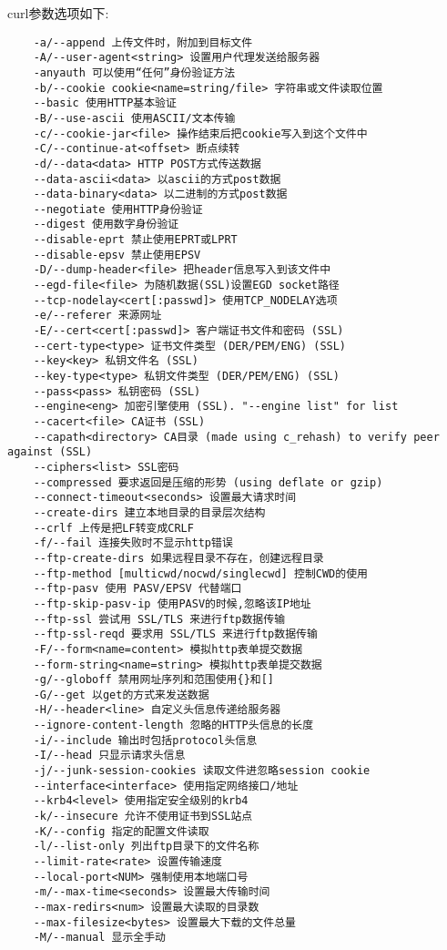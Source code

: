\documentclass[a4paper,left=2.5cm,right=2.5cm,11pt]{article}
\begin{document}
	curl参数选项如下:
	\begin{lstlisting}
	-a/--append 上传文件时，附加到目标文件 
	-A/--user-agent<string> 设置用户代理发送给服务器 
	-anyauth 可以使用“任何”身份验证方法 
	-b/--cookie cookie<name=string/file> 字符串或文件读取位置 
	--basic 使用HTTP基本验证 
	-B/--use-ascii 使用ASCII/文本传输 
	-c/--cookie-jar<file> 操作结束后把cookie写入到这个文件中 
	-C/--continue-at<offset> 断点续转 
	-d/--data<data> HTTP POST方式传送数据 
	--data-ascii<data> 以ascii的方式post数据 
	--data-binary<data> 以二进制的方式post数据 
	--negotiate 使用HTTP身份验证 
	--digest 使用数字身份验证 
	--disable-eprt 禁止使用EPRT或LPRT 
	--disable-epsv 禁止使用EPSV 
	-D/--dump-header<file> 把header信息写入到该文件中 
	--egd-file<file> 为随机数据(SSL)设置EGD socket路径 
	--tcp-nodelay<cert[:passwd]> 使用TCP_NODELAY选项 
	-e/--referer 来源网址 
	-E/--cert<cert[:passwd]> 客户端证书文件和密码 (SSL) 
	--cert-type<type> 证书文件类型 (DER/PEM/ENG) (SSL) 
	--key<key> 私钥文件名 (SSL) 
	--key-type<type> 私钥文件类型 (DER/PEM/ENG) (SSL) 
	--pass<pass> 私钥密码 (SSL) 
	--engine<eng> 加密引擎使用 (SSL). "--engine list" for list 
	--cacert<file> CA证书 (SSL) 
	--capath<directory> CA目录 (made using c_rehash) to verify peer against (SSL) 
	--ciphers<list> SSL密码 
	--compressed 要求返回是压缩的形势 (using deflate or gzip) 
	--connect-timeout<seconds> 设置最大请求时间 
	--create-dirs 建立本地目录的目录层次结构 
	--crlf 上传是把LF转变成CRLF 
	-f/--fail 连接失败时不显示http错误 
	--ftp-create-dirs 如果远程目录不存在，创建远程目录 
	--ftp-method [multicwd/nocwd/singlecwd] 控制CWD的使用 
	--ftp-pasv 使用 PASV/EPSV 代替端口 
	--ftp-skip-pasv-ip 使用PASV的时候,忽略该IP地址 
	--ftp-ssl 尝试用 SSL/TLS 来进行ftp数据传输 
	--ftp-ssl-reqd 要求用 SSL/TLS 来进行ftp数据传输 
	-F/--form<name=content> 模拟http表单提交数据 
	--form-string<name=string> 模拟http表单提交数据 
	-g/--globoff 禁用网址序列和范围使用{}和[] 
	-G/--get 以get的方式来发送数据 
	-H/--header<line> 自定义头信息传递给服务器 
	--ignore-content-length 忽略的HTTP头信息的长度 
	-i/--include 输出时包括protocol头信息 
	-I/--head 只显示请求头信息 
	-j/--junk-session-cookies 读取文件进忽略session cookie 
	--interface<interface> 使用指定网络接口/地址 
	--krb4<level> 使用指定安全级别的krb4 
	-k/--insecure 允许不使用证书到SSL站点 
	-K/--config 指定的配置文件读取 
	-l/--list-only 列出ftp目录下的文件名称 
	--limit-rate<rate> 设置传输速度 
	--local-port<NUM> 强制使用本地端口号 
	-m/--max-time<seconds> 设置最大传输时间 
	--max-redirs<num> 设置最大读取的目录数 
	--max-filesize<bytes> 设置最大下载的文件总量 
	-M/--manual 显示全手动 

\end{lstlisting}
\end{document}
